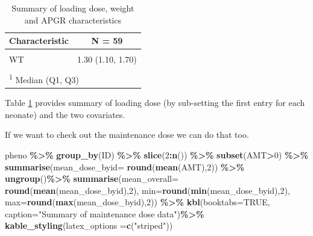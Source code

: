 \documentclass[
]{article}
\newenvironment{Shaded}{\begin{snugshade}}{\end{snugshade}}
\newcommand{\AttributeTok}[1]{\textcolor[rgb]{0.13,0.29,0.53}{#1}}
\newcommand{\ConstantTok}[1]{\textcolor[rgb]{0.56,0.35,0.01}{#1}}
\newcommand{\DecValTok}[1]{\textcolor[rgb]{0.00,0.00,0.81}{#1}}
\newcommand{\FunctionTok}[1]{\textcolor[rgb]{0.13,0.29,0.53}{\textbf{#1}}}
\newcommand{\NormalTok}[1]{#1}
\newcommand{\SpecialCharTok}[1]{\textcolor[rgb]{0.81,0.36,0.00}{\textbf{#1}}}
\newcommand{\StringTok}[1]{\textcolor[rgb]{0.31,0.60,0.02}{#1}}
\begin{document}
\begin{table}
\centering
\caption{\label{tab:load}Summary of loading dose, weight and APGR characteristics}
\centering
\begin{tabular}[t]{lc}
\toprule
\textbf{Characteristic} & \textbf{N = 59}\\
\midrule
\cellcolor{gray!10}{AMT} & \cellcolor{gray!10}{23 (17, 27)}\\
WT & 1.30 (1.10, 1.70)\\
\cellcolor{gray!10}{APGR} & \cellcolor{gray!10}{7 (5, 8)}\\
\bottomrule
\multicolumn{2}{l}{\rule{0pt}{1em}\textsuperscript{1} Median (Q1, Q3)}\\
\end{tabular}
\end{table}

Table \ref{tab:load} provides summary of loading dose (by sub-setting the first entry for each neonate) and the two covariates.

If we want to check out the maintenance dose we can do that too.

\begin{Shaded}
\begin{Highlighting}[]
\NormalTok{pheno }\SpecialCharTok{\%\textgreater{}\%} 
  \FunctionTok{group\_by}\NormalTok{(ID) }\SpecialCharTok{\%\textgreater{}\%} 
  \FunctionTok{slice}\NormalTok{(}\DecValTok{2}\SpecialCharTok{:}\FunctionTok{n}\NormalTok{()) }\SpecialCharTok{\%\textgreater{}\%} 
  \FunctionTok{subset}\NormalTok{(AMT}\SpecialCharTok{\textgreater{}}\DecValTok{0}\NormalTok{) }\SpecialCharTok{\%\textgreater{}\%} 
  \FunctionTok{summarise}\NormalTok{(}\AttributeTok{mean\_dose\_byid=} \FunctionTok{round}\NormalTok{(}\FunctionTok{mean}\NormalTok{(AMT),}\DecValTok{2}\NormalTok{)) }\SpecialCharTok{\%\textgreater{}\%} 
  \FunctionTok{ungroup}\NormalTok{()}\SpecialCharTok{\%\textgreater{}\%}
  \FunctionTok{summarise}\NormalTok{(}\AttributeTok{mean\_overall=} \FunctionTok{round}\NormalTok{(}\FunctionTok{mean}\NormalTok{(mean\_dose\_byid),}\DecValTok{2}\NormalTok{),}
            \AttributeTok{min=}\FunctionTok{round}\NormalTok{(}\FunctionTok{min}\NormalTok{(mean\_dose\_byid),}\DecValTok{2}\NormalTok{),}
            \AttributeTok{max=}\FunctionTok{round}\NormalTok{(}\FunctionTok{max}\NormalTok{(mean\_dose\_byid),}\DecValTok{2}\NormalTok{)) }\SpecialCharTok{\%\textgreater{}\%}
  \FunctionTok{kbl}\NormalTok{(}\AttributeTok{booktabs=}\ConstantTok{TRUE}\NormalTok{, }\AttributeTok{caption=}\StringTok{"Summary of maintenance dose data"}\NormalTok{)}\SpecialCharTok{\%\textgreater{}\%}
  \FunctionTok{kable\_styling}\NormalTok{(}\AttributeTok{latex\_options =}\FunctionTok{c}\NormalTok{(}\StringTok{"striped"}\NormalTok{))}
\end{Highlighting}
\end{Shaded}
\end{document}
